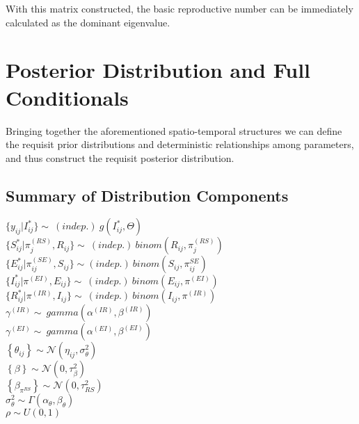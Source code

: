 \documentclass[12pt]{article}
\newcommand \noi {\noindent}
\begin{document}
With this matrix constructed, the basic reproductive number can be immediately calculated as the dominant eigenvalue. 


\section{Posterior Distribution and Full Conditionals}
Bringing together the aforementioned spatio-temporal structures we can define the requisit prior distributions and 
deterministic relationships among parameters, and thus construct the requisit posterior distribution. 

\subsection{Summary of Distribution Components}
\noi $\{y_{ij} | I^*_{ij}\} \sim\ (indep.)\ g(I^*_{ij}, \Theta)$\\

\noi $\{S_{ij}^* | \pi_j^{(RS)}, R_{ij}\} \sim\ (indep.)\  binom(R_{ij}, \pi_j^{(RS)})$\\

\noi $\{E_{ij}^* | \pi^{(SE)}_{ij}, S_{ij} \} \sim (indep.)\ binom(S_{ij}, \pi^{SE}_{ij})$ \\

\noi $\{I_{ij}^* | \pi^{(EI)}, E_{ij} \} \sim\ (indep.)\ binom(E_{ij}, \pi^{(EI)})$\\

\noi $\{R_{ij}^* | \pi^{(IR)}, I_{ij}\} \sim\ (indep.)\ binom(I_{ij}, \pi^{(IR)})$\\

\noi $\gamma^{(IR)} \sim\ gamma(\alpha^{(IR)}, \beta^{(IR)})$\\ 

\noi $\gamma^{(EI)} \sim\ gamma(\alpha^{(EI)}, \beta^{(EI)})$\\ 

\noi $\left\{ \theta_{ij}\right\} \sim \mathcal{N}(\eta_{ij}, \sigma^2_{\theta})$ \\

\noi $\left\{ \beta \right\} \sim \mathcal{N}(0, \tau^2_\beta) $\\ 

\noi $\left\{ \beta_{\pi^{RS}} \right\} \sim \mathcal{N}(0, \tau^2_{RS}) $\\ 

\noi $\sigma^2_{\theta} \sim \Gamma(\alpha_\theta, \beta_\theta)$\\

\noi $\rho \sim U(0,1)$
\end{document}
